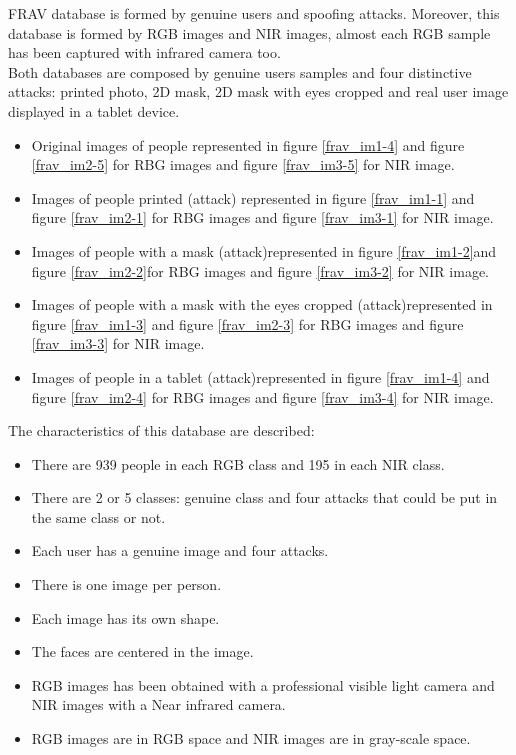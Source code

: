 FRAV database is formed by genuine users and spoofing attacks. Moreover, this database is formed by RGB images and NIR images, almost each RGB sample has been captured with infrared camera too.\\

Both databases are composed by genuine users samples and four distinctive attacks: printed photo, 2D mask, 2D mask with eyes cropped and real user image displayed in a tablet device.\\

\begin{itemize}[itemsep=2pt,topsep=8pt,parsep=0pt,partopsep=20pt]
 \item Original images of people represented in figure \ref{frav_im1-4} and figure \ref{frav_im2-5} for RBG images and figure \ref{frav_im3-5} for NIR image.
 \item Images of people printed (attack) represented in figure \ref{frav_im1-1} and figure \ref{frav_im2-1} for RBG images and figure \ref{frav_im3-1} for NIR image.
 \item Images of people with a mask (attack)represented in figure \ref{frav_im1-2}and figure \ref{frav_im2-2}for RBG images and figure \ref{frav_im3-2} for NIR image.
 \item Images of people with a mask with the eyes cropped (attack)represented in figure \ref{frav_im1-3} and figure \ref{frav_im2-3} for RBG images and figure \ref{frav_im3-3} for NIR image.
 \item Images of people in a tablet (attack)represented in figure \ref{frav_im1-4} and figure \ref{frav_im2-4} for RBG images and figure \ref{frav_im3-4} for NIR image.\\
 \end{itemize}

The characteristics of this database are described:
\begin{itemize}[itemsep=2pt,topsep=8pt,parsep=0pt,partopsep=20pt]
\item There are 939 people in each RGB class and 195 in each NIR class.
\item There are 2 or 5 classes: genuine class and four attacks that could be put in the same class or not.
\item Each user has a genuine image and four attacks.
\item There is one image per person.
\item Each image has its own shape.
\item The faces are centered in the image.
\item RGB images has been obtained with a professional visible light camera and NIR images with a Near infrared camera.
\item RGB images are in RGB space and NIR images are in gray-scale space.
\end{itemize}

